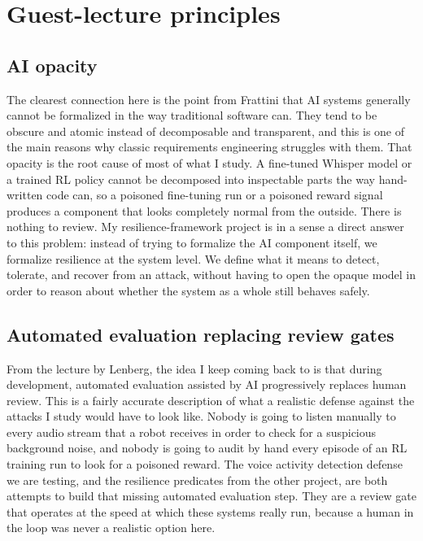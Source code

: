 \documentclass[11pt,a4paper]{article}
\begin{document}
\section{Guest-lecture principles}


\subsection{AI opacity}

The clearest connection here is the point from Frattini that AI systems generally cannot be formalized in the way traditional software can. They tend to be obscure and atomic instead of decomposable and transparent, and this is one of the main reasons why classic requirements engineering struggles with them. That opacity is the root cause of most of what I study. A fine-tuned Whisper model or a trained RL policy cannot be decomposed into inspectable parts the way hand-written code can, so a poisoned fine-tuning run or a poisoned reward signal produces a component that looks completely normal from the outside. There is nothing to review. My resilience-framework project is in a sense a direct answer to this problem: instead of trying to formalize the AI component itself, we formalize resilience at the system level. We define what it means to detect, tolerate, and recover from an attack, without having to open the opaque model in order to reason about whether the system as a whole still behaves safely.

\subsection{Automated evaluation replacing review gates}

From the lecture by Lenberg, the idea I keep coming back to is that during development, automated evaluation assisted by AI progressively replaces human review. This is a fairly accurate description of what a realistic defense against the attacks I study would have to look like. Nobody is going to listen manually to every audio stream that a robot receives in order to check for a suspicious background noise, and nobody is going to audit by hand every episode of an RL training run to look for a poisoned reward. The voice activity detection defense we are testing, and the resilience predicates from the other project, are both attempts to build that missing automated evaluation step. They are a review gate that operates at the speed at which these systems really run, because a human in the loop was never a realistic option here.
\end{document}
